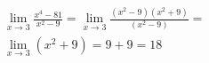 \begin{ex}
\begin{align}
&\lim_{x\rightarrow 3} \frac{x^4-81}{x^2-9}=\lim_{x\rightarrow 3} \frac{(x^2-9)(x^2+9)}{(x^2-9)}=\nonumber\\
&\lim_{x\rightarrow 3} (x^2+9)=9+9=18\nonumber
\end{align}
\end{ex}